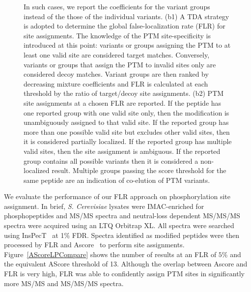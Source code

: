 \documentclass[arial,11pt]{article}
\begin{document}
\begin{figure}
\begin{center}
{In such cases, we report the coefficients for the variant groups instead of the those of the individual variants.
(b1) A TDA strategy is adopted to determine the global false-localization rate (FLR) for site assignments. The knowledge of the PTM site-specificity is introduced at this point: variants or groups assigning the PTM to at least one valid site are considered target matches. Conversely, variants or groups that assign the PTM to invalid sites only are considered decoy matches. %
Variant groups are then ranked by decreasing mixture coefficients and FLR is calculated at each threshold by the ratio of target/decoy site assignments.
(b2) PTM site assignments at a chosen FLR are reported. If the peptide has one reported group with one valid site only, then the modification is unambiguously assigned to that valid site. If the reported group has more than one possible valid site but excludes other valid sites, then it is considered partially localized. If the reported group has multiple valid sites, then the site assignment is ambiguous. If the reported group contains all possible variants then it is considered a non-localized result. Multiple groups passing the score threshold for the same peptide are an indication of co-elution of PTM variants.%
\label{fig:flowchart}}

\end{center}
\end{figure}

We evaluate the performance of our FLR approach on phosphorylation site assignment. In brief, {\em S. Cerevisiae} lysates were IMAC-enriched for phosphopeptides and MS/MS spectra and neutral-loss dependent MS/MS/MS spectra were acquired using an LTQ Orbitrap XL. %
%
All spectra were searched using InsPecT~\cite{tanner05} at 1\% FDR. %
Spectra identified as modified peptides were then processed by FLR and Ascore~\cite{beausoleil06} to perform site assignments.  Figure~\ref{AScoreLPCompare} shows the number of results at an FLR of $5\%$ and the equivalent AScore threshold of 13. Although the overlap between Ascore and FLR is very high, FLR was able to confidently assign PTM sites in significantly more MS/MS and MS/MS/MS spectra.
\end{document}
